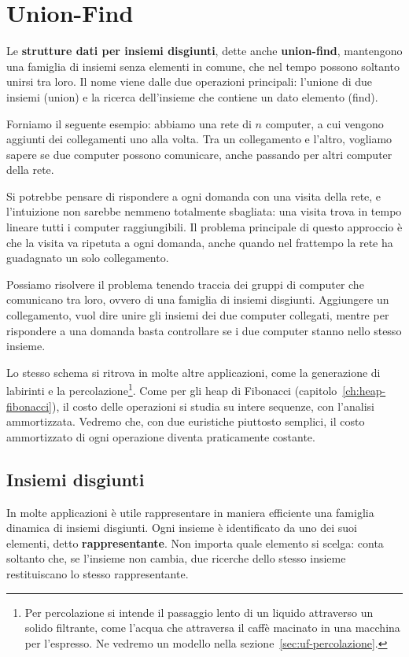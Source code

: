 \chapter{Union-Find}\label{ch:union-find}
Le \textbf{strutture dati per insiemi disgiunti}, dette anche \textbf{union-find}, mantengono una famiglia di insiemi senza elementi in comune, che nel tempo possono soltanto unirsi tra loro. Il nome viene dalle due operazioni principali: l'unione di due insiemi (union) e la ricerca dell'insieme che contiene un dato elemento (find).

Forniamo il seguente esempio: abbiamo una rete di $n$ computer, a cui vengono aggiunti dei collegamenti uno alla volta. Tra un collegamento e l'altro, vogliamo sapere se due computer possono comunicare, anche passando per altri computer della rete.

Si potrebbe pensare di rispondere a ogni domanda con una visita della rete, e l'intuizione non sarebbe nemmeno totalmente sbagliata: una visita trova in tempo lineare tutti i computer raggiungibili. Il problema principale di questo approccio è che la visita va ripetuta a ogni domanda, anche quando nel frattempo la rete ha guadagnato un solo collegamento.

Possiamo risolvere il problema tenendo traccia dei gruppi di computer che comunicano tra loro, ovvero di una famiglia di insiemi disgiunti. Aggiungere un collegamento, vuol dire unire gli insiemi dei due computer collegati, mentre per rispondere a una domanda basta controllare se i due computer stanno nello stesso insieme.

Lo stesso schema si ritrova in molte altre applicazioni, come la generazione di labirinti e la percolazione\footnote{Per percolazione si intende il passaggio lento di un liquido attraverso un solido filtrante, come l'acqua che attraversa il caffè macinato in una macchina per l'espresso. Ne vedremo un modello nella sezione~\ref{sec:uf-percolazione}.}. Come per gli heap di Fibonacci (capitolo~\ref{ch:heap-fibonacci}), il costo delle operazioni si studia su intere sequenze, con l'analisi ammortizzata. Vedremo che, con due euristiche piuttosto semplici, il costo ammortizzato di ogni operazione diventa praticamente costante.

\section{Insiemi disgiunti}\label{sec:uf-insiemi}
In molte applicazioni è utile rappresentare in maniera efficiente una famiglia dinamica di insiemi disgiunti. Ogni insieme è identificato da uno dei suoi elementi, detto \textbf{rappresentante}. Non importa quale elemento si scelga: conta soltanto che, se l'insieme non cambia, due ricerche dello stesso insieme restituiscano lo stesso rappresentante.

